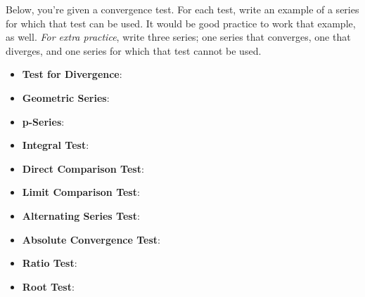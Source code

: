 \documentclass[notes]{subfiles}
\begin{document}
		\begin{ex}
			Below, you're given a convergence test.  For each test, write an example of a series for which that test can be used.  It would be good practice to work that example, as well.  \emph{For extra practice}, write three series; one series that converges, one that diverges, and one series for which that test cannot be used.
			\begin{itemize}
			\item \textbf{Test for Divergence}: 
				
			\item \textbf{Geometric Series}:
				
			\item \textbf{p-Series}:
				
			\item \textbf{Integral Test}:
				
			\item \textbf{Direct Comparison Test}:
				\newpage
				
			\item \textbf{Limit Comparison Test}:
				
			\item \textbf{Alternating Series Test}:
				
			\item \textbf{Absolute Convergence Test}:
				
			\item \textbf{Ratio Test}:
				
			\item \textbf{Root Test}:
			\end{itemize}
		\end{ex}
			\newpage
			
\end{document}
